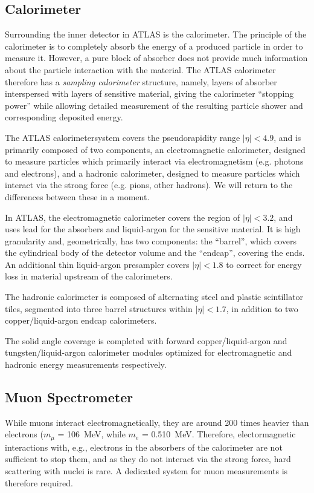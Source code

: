 \subsection{Calorimeter}
Surrounding the inner detector in ATLAS is the calorimeter. The principle of the calorimeter is to 
completely absorb the energy of a produced particle in order to measure it. However, a pure block 
of absorber does not provide much information about the particle interaction with the material. 
The ATLAS calorimeter therefore has a \emph{sampling calorimeter} structure, namely, layers 
of absorber interspersed with layers of sensitive material, giving the calorimeter ``stopping power'' 
while allowing detailed measurement of the resulting particle shower and corresponding deposited energy.

The ATLAS calorimetersystem covers the pseudorapidity range \(|\eta| < 4.9\), 
and is primarily composed of two components, an electromagnetic calorimeter, 
designed to measure particles which primarily interact via electromagnetism 
(e.g. photons and electrons), and a hadronic calorimeter, designed to measure 
particles which interact via the strong force (e.g. pions, other hadrons). We 
will return to the differences between these in a moment. 

In ATLAS, the electromagnetic calorimeter covers the region of \(|\eta|< 3.2\),
and uses lead for the absorbers and liquid-argon for the sensitive material. It is high 
granularity and, geometrically, has two components: the ``barrel'', which covers the cylindrical body 
of the detector volume and the ``endcap'', covering the ends. An additional thin liquid-argon presampler 
covers \(|\eta| < 1.8\) to correct for energy loss in material upstream of the calorimeters.

The hadronic calorimeter is composed of alternating steel and plastic scintillator tiles,
segmented into three barrel structures within \(|\eta| < 1.7\), in addition to two copper/liquid-argon 
endcap calorimeters.

The solid angle coverage is completed with forward copper/liquid-argon and tungsten/liquid-argon 
calorimeter modules optimized for electromagnetic and hadronic energy measurements respectively.

\subsection{Muon Spectrometer}
While muons interact electromagnetically, they are around 200 times heavier than electrons 
($m_{\mu}$ = \SI{106}{\MeV}, while $m_{e}$ = \SI{0.510}{\MeV}. 
Therefore, electormagnetic interactions with, e.g., electrons in the absorbers of the calorimeter 
are not sufficient to stop them, and as they do not interact via the strong force, hard scattering with 
nuclei is rare. A dedicated system for muon measurements is therefore required. 

